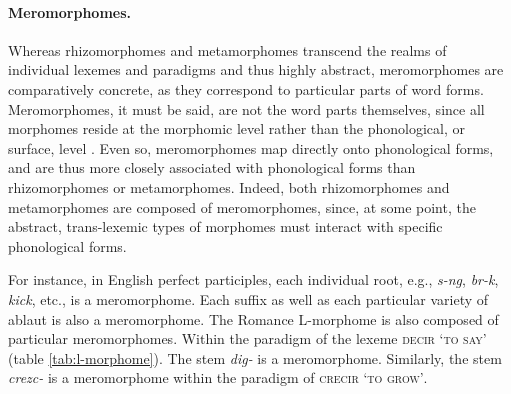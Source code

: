 \paragraph{Meromorphomes.} Whereas rhizomorphomes and metamorphomes 
transcend the realms of individual lexemes and paradigms and thus highly 
abstract, meromorphomes are comparatively concrete, as they 
correspond to particular parts of word forms. Meromorphomes, it must be said, 
are not the word parts themselves, since all morphomes reside at the 
morphomic level rather than the phonological, or surface, level \citep{round:2011}. 
Even so, meromorphomes map directly onto phonological forms, and 
are thus more closely associated with phonological forms than rhizomorphomes 
or metamorphomes. Indeed, both rhizomorphomes and metamorphomes are 
composed of meromorphomes, since, at some point, the abstract, trans-lexemic 
types of morphomes must interact with specific phonological forms. 

For instance, in English perfect participles, each individual root, e.g., \textit{s-ng}, 
\textit{br-k}, \textit{kick}, etc., is a meromorphome. Each suffix 
as well as each particular variety of ablaut is also a meromorphome. 
The Romance L-morphome is also composed of particular meromorphomes. 
Within the paradigm of the lexeme \textsc{decir} \textsc{`to say'} 
(table \ref{tab:l-morphome}). The stem \textit{dig-} is a meromorphome. 
Similarly, the stem \textit{crezc-} is a meromorphome within the paradigm of 
\textsc{crecir} \textsc{`to grow'}. %

\begin{table}[ht]
\begin{center}
\label{tab:fusion}
\caption{Fusional suffixes in Hebrew nominals}
\end{center}
\end{table}


